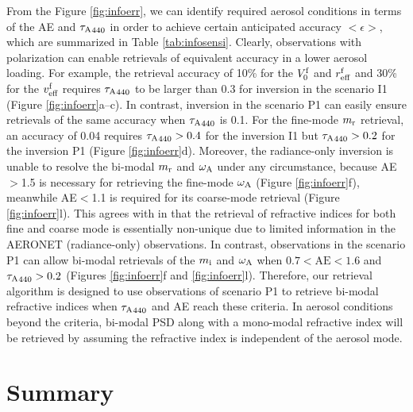 From the Figure \ref{fig:infoerr}, we can identify 
required aerosol conditions in terms of the AE and ${\tau_\text{A}}_{440}$ in order
to achieve certain anticipated accuracy $<\epsilon>$, which are summarized
in Table \ref{tab:infosensi}. Clearly, observations with polarization can enable 
retrievals of equivalent accuracy in a lower aerosol loading. For example, the 
retrieval accuracy of 10\% for the $V_0^\text{f}$ and $r_\text{eff}^\text{f}$ and 30\% for the
$v_\text{eff}^\text{f}$ requires ${\tau_\text{A}}_{440}$ to be larger than 0.3 for 
inversion in the scenario I1 (Figure \ref{fig:infoerr}a--c). In
contrast, inversion in the scenario P1 can easily ensure retrievals of
the same accuracy when ${\tau_\text{A}}_{440}$ is 0.1. For the fine-mode
$m_\text{r}$ retrieval, an accuracy of 0.04 requires ${\tau_\text{A}}_{440}>0.4$ for the
inversion I1 but ${\tau_\text{A}}_{440}>0.2$ for the inversion P1 (Figure
\ref{fig:infoerr}d). Moreover, the radiance-only inversion
is unable to resolve the bi-modal $m_\text{r}$ and $\omega_\text{A}$ under any circumstance,
because AE$>$1.5 is necessary for retrieving the fine-mode $\omega_\text{A}$
(Figure \ref{fig:infoerr}f), meanwhile AE$<$1.1 is required for its 
coarse-mode retrieval (Figure \ref{fig:infoerr}l). This agrees with 
\citet{Dubovik00b} in that the retrieval of refractive indices for both fine
and coarse mode is essentially non-unique due to limited information in the
AERONET (radiance-only) observations. In contrast, observations in the
scenario P1 can allow bi-modal retrievals of the $m_\text{i}$ and $\omega_\text{A}$ when 
$0.7<\text{AE}<1.6$ and ${\tau_\text{A}}_{440}>0.2$ (Figures \ref{fig:infoerr}f
and \ref{fig:infoerr}l). Therefore, our retrieval algorithm is designed
to use observations of scenario P1 to retrieve bi-modal refractive indices 
when ${\tau_\text{A}}_{440}$ and AE reach these criteria. In aerosol conditions beyond
the criteria, bi-modal PSD along with a mono-modal refractive index will be 
retrieved by assuming the refractive index is independent of the aerosol mode.

\section{Summary} \label{sec:infosummary}

